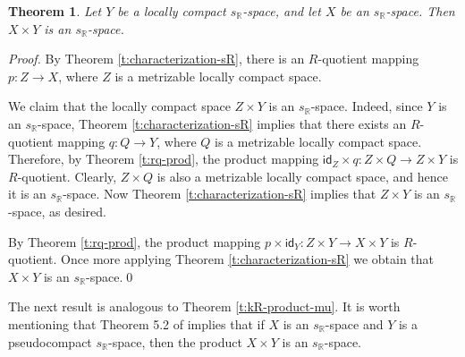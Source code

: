 \documentclass[preprint,11pt]{elsarticle}
\newtheorem{theorem}{Theorem}[section]
\newtheorem{lemma}[theorem]{Lemma}
\numberwithin{equation}{section}
\numberwithin{theorem}{section}
\newcommand{\NN}{\mathbb{N}}
\newcommand{\IR}{\mathbb{R}}
\newcommand{\Id}{\mathsf{id}}
\begin{document}


\begin{theorem} \label{t:lc-sR=sR}
Let $Y$ be a locally  compact $s_\IR$-space, and let $X$ be an $s_\IR$-space. Then $X\times Y$ is an $s_\IR$-space.
\end{theorem}

\begin{proof}
By Theorem \ref{t:characterization-sR}, there is an $R$-quotient mapping $p:Z\to X$, where $Z$ is a metrizable locally compact space.

We claim that the locally compact space $Z\times Y$ is an $s_\IR$-space. Indeed, since $Y$ is an $s_\IR$-space, Theorem \ref{t:characterization-sR} implies that there exists an $R$-quotient mapping $q:Q\to Y$, where $Q$ is a metrizable locally compact space. Therefore, by Theorem \ref{t:rq-prod}, the product mapping $\Id_Z\times q:Z\times Q\to Z\times Y$ is $R$-quotient. Clearly, $Z\times Q$ is also a metrizable locally compact space, and hence it is an $s_\IR$-space.  Now Theorem \ref{t:characterization-sR} implies that  $Z\times Y$ is an $s_\IR$-space, as desired.

By Theorem \ref{t:rq-prod}, the product mapping $p\times \Id_Y:Z\times Y\to X\times Y$ is $R$-quotient. Once more applying Theorem \ref{t:characterization-sR} we obtain that $X\times Y$ is an $s_\IR$-space.\qed
\end{proof}

The next result is analogous to Theorem \ref{t:kR-product-mu}. It is worth mentioning that Theorem 5.2 of \cite{Nob} implies that if $X$ is an $s_\IR$-space and $Y$ is a pseudocompact $s_\IR$-space, then the product $X\times Y$ is an $s_\IR$-space.

\end{document}
